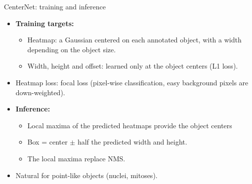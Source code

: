 \documentclass[xcolor=pdftex,dvipsnames,table]{beamer}
\begin{document}
\begin{frame}{CenterNet: training and inference}
\begin{itemize}
   \item \textbf{Training targets:}
   \begin{itemize}
      \item Heatmap: a Gaussian centered on each annotated object, with a width depending on the object size.
      \item Width, height and offset: learned only at the object centers (L1 loss).
   \end{itemize}
   \item Heatmap loss: focal loss (pixel-wise classification, easy background pixels are down-weighted).
   \item \textbf{Inference:}
   \begin{itemize}
      \item Local maxima of the predicted heatmaps provide the object centers
      \item Box = center $\pm$ half the predicted width and height.
      \item The local maxima replace NMS.
   \end{itemize}
   \item Natural for point-like objects (nuclei, mitoses).
\end{itemize}
\end{frame}
\end{document}
